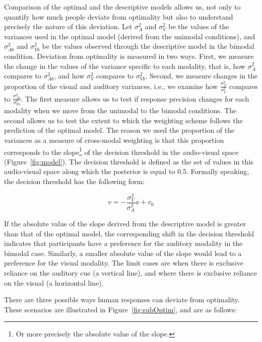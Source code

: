 \documentclass[english,,man,floatsintext]{apa6}
\let\rmarkdownfootnote\footnote%
\def\footnote{\protect\rmarkdownfootnote}
\theoremstyle{definition}
\theoremstyle{definition}
\theoremstyle{definition}
\theoremstyle{remark}
\begin{document}
Comparison of the optimal and the descriptive models allows us, not only
to quantify how much people deviate from optimality but also to
understand precisely the nature of this deviation. Let \(\sigma^2_{A}\)
and \(\sigma^2_{V}\) be the values of the variances used in the optimal
model (derived from the unimodal conditions), and \(\sigma^2_{Ab}\) and
\(\sigma^2_{Vb}\) be the values observed through the descriptive model
in the bimodal condition. Deviation from optimality is measured in two
ways. First, we measure the change in the values of the variance
specific to each modality, that is, how \(\sigma^2_{A}\) compares to
\(\sigma^2_{Ab}\), and how \(\sigma^2_{V}\) compares to
\(\sigma^2_{Vb}\). Second, we measure changes in the proportion of the
visual and auditory variances, i.e., we examine how
\(\frac{\sigma^2_{A}}{\sigma^2_{V}}\) compares to
\(\frac{\sigma^2_{Ab}}{\sigma^2_{Vb}}\). The first measure allows us to
test if response precision changes for each modality when we move from
the unimodal to the bimodal conditions. The second allows us to test the
extent to which the weighting scheme follows the prediction of the
optimal model. The reason we used the proportion of the variances as a
measure of cross-modal weighting is that this proportion corresponds to
the slope\footnote{Or more precisely the absolute value of the slope.}
of the decision threshold in the audio-visual space
(Figure~\ref{fig:model}). The decision threshold is defined as the set
of values in this audio-visual space along which the posterior is equal
to 0.5. Formally speaking, the decision threshold has the following
form:

\[v=-\frac{\sigma^2_V}{\sigma^2_A}a+v_0\]

If the absolute value of the slope derived from the descriptive model is
greater than that of the optimal model, the corresponding shift in the
decision threshold indicates that participants have a preference for the
auditory modality in the bimodal case. Similarly, a smaller absolute
value of the slope would lead to a preference for the visual modality.
The limit cases are when there is exclusive reliance on the auditory cue
(a vertical line), and where there is exclusive reliance on the visual
(a horizontal line).

There are three possible ways human responses can deviate from
optimality. These scenarios are illustrated in
Figure~\ref{fig:subOptim}, and are as follows:
\end{document}
